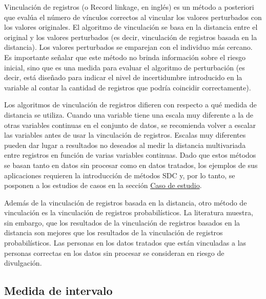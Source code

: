 \documentclass[
]{book}
\theoremstyle{definition}
\theoremstyle{definition}
\theoremstyle{definition}
\theoremstyle{definition}
\theoremstyle{remark}
\begin{document}
Vinculación de registros (o Record linkage, en inglés) es un método a posteriori que evalúa el número de vínculos correctos al vincular los valores perturbados con los valores originales. El algoritmo de vinculación se basa en la distancia entre el original y los valores perturbados (es decir, vinculación de registros basada en la distancia). Los valores perturbados se emparejan con el individuo más cercano. Es importante señalar que este método no brinda información sobre el riesgo inicial, sino que es una medida para evaluar el algoritmo de perturbación (es decir, está diseñado para indicar el nivel de incertidumbre introducido en la variable al contar la cantidad de registros que podría coincidir correctamente).

Los algoritmos de vinculación de registros difieren con respecto a qué medida de distancia se utiliza. Cuando una variable tiene una escala muy diferente a la de otras variables continuas en el conjunto de datos, se recomienda volver a escalar las variables antes de usar la vinculación de registros. Escalas muy diferentes pueden dar lugar a resultados no deseados al medir la distancia multivariada entre registros en función de varias variables continuas. Dado que estos métodos se basan tanto en datos sin procesar como en datos tratados, los ejemplos de sus aplicaciones requieren la introducción de métodos SDC y, por lo tanto, se posponen a los estudios de casos en la sección \protect\hyperlink{caso-de-estudio}{Caso de estudio}.

Además de la vinculación de registros basada en la distancia, otro método de vinculación es la vinculación de registros probabilísticos. La literatura muestra, sin embargo, que los resultados de la vinculación de registros basados en la distancia son mejores que los resultados de la vinculación de registros probabilísticos. Las personas en los datos tratados que están vinculadas a las personas correctas en los datos sin procesar se consideran en riesgo de divulgación.

\hypertarget{medida-de-intervalo}{%
\subsection{Medida de intervalo}\label{medida-de-intervalo}}
\end{document}
